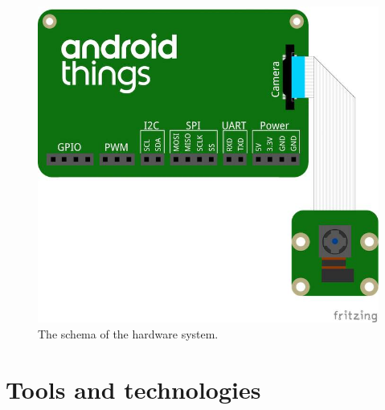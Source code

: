 \documentclass[runningheads,a4paper,11pt]{report}
\begin{document}
\begin{figure}[H]
	\centerline{\includegraphics[scale=0.3]{schematics.jpg}}  
	\caption{The schema of the hardware system.}
	\label{Hardware schema}
\end{figure}

\section{Tools and technologies}

\label{section:tools}
\end{document}
